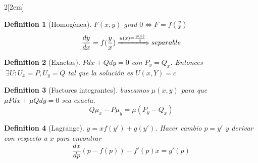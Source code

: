 \documentclass[leqno]{article}
\newtheorem*{definition}{Definition}
\begin{document}
\begin{multicols}{2}[\columnsep2em]
\begin{definition}[Homogénea] $F(x,y)$ grad $0 \iff F = f(\frac{y}{x})$
  \[
  \frac{d y}{d x} = f(\frac{y}{x}) \xRightarrow{u(x) = \frac{y(x)}{x}} separable
  \] 
\end{definition}

\begin{definition}[Exactas] $Pdx + Qdy = 0$ con  $P_y=Q_x$. Entonces  $\ \exists U: U_x = P, U_y = Q$ tal que la solución es $U(x, Y) = c$
\end{definition}

\begin{definition}[Factores integrantes] buscamos $\mu(x, y)$ para que $\mu Pdx + \mu Qdy =0$ sea exacta.
\[
Q\mu_x-P\mu_y = \mu(P_y-Q_x)
\] 
\end{definition}

\begin{definition}[Lagrange] $y=xf(y')+g(y')$. Hacer cambio $p=y'$ y derivar con respecto a $x$ para encontrar
   \[
  \frac{d x}{d p}(p-f(p)) - f'(p)x=g'(p)  
  \] 
\end{definition}



\end{multicols}
\end{document}
